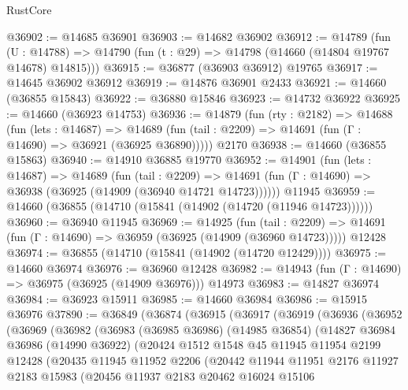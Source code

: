 \begin{lexlean}{RustCore}
\begin{coremodule}
@36902 := @14685 @36901
@36903 := @14682 @36902
@36912 := @14789
    (fun (U : @14788) => @14790 (fun (t : @29) => @14798 (@14660 (@14804 @19767 @14678) @14815)))
@36915 := @36877 (@36903 @36912) @19765
@36917 := @14645 @36902 @36912
@36919 := @14876 @36901 @2433
@36921 := @14660 (@36855 @15843)
@36922 := @36880 @15846
@36923 := @14732 @36922
@36925 := @14660 (@36923 @14753)
@36936 := @14879
    (fun (rty : @2182) =>
    @14688
      (fun (lets : @14687) =>
      @14689 (fun (tail : @2209) => @14691 (fun (Γ : @14690) => @36921 (@36925 @36890)))))
    @2170
@36938 := @14660 (@36855 @15863)
@36940 := @14910 @36885 @19770
@36952 := @14901
    (fun (lets : @14687) =>
    @14689
      (fun (tail : @2209) =>
      @14691 (fun (Γ : @14690) => @36938 (@36925 (@14909 (@36940 @14721 @14723))))))
    @11945
@36959 := @14660 (@36855 (@14710 (@15841 (@14902 (@14720 (@11946 @14723))))))
@36960 := @36940 @11945
@36969 := @14925
    (fun (tail : @2209) => @14691 (fun (Γ : @14690) => @36959 (@36925 (@14909 (@36960 @14723)))))
    @12428
@36974 := @36855 (@14710 (@15841 (@14902 (@14720 @12429))))
@36975 := @14660 @36974
@36976 := @36960 @12428
@36982 := @14943 (fun (Γ : @14690) => @36975 (@36925 (@14909 @36976))) @14973
@36983 := @14827 @36974
@36984 := @36923 @15911
@36985 := @14660 @36984
@36986 := @15915 @36976
@37890 := @36849
    (@36874
      (@36915
        (@36917
          (@36919
            (@36936
              (@36952
                (@36969
                  (@36982
                    (@36983
                      (@36985 @36986)
                      (@14985 @36854)
                      (@14827
                        @36984
                        @36986
                        (@14990 @36922)
                        (@20424
                          @1512
                          @1548
                          @45
                          @11945
                          @11954
                          @2199
                          @12428
                          (@20435
                            @11945
                            @11952
                            @2206
                            (@20442
                              @11944
                              @11951
                              @2176
                              @11927
                              @2183
                              @15983
                              (@20456
                                @11937
                                @2183
                                @20462
                                @16024
                                @15106

\end{coremodule}
\end{lexlean}
